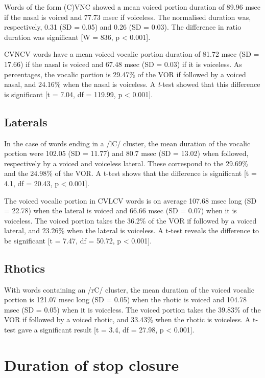 \documentclass[11pt,a4paper,openany]{memoir}\usepackage[]{graphicx}\usepackage[]{color}
\begin{document}
Words of the form (C)VNC showed a mean voiced portion duration of 89.96 msec if the nasal is voiced and 77.73 msec if voiceless.
The normalised duration was, respectively, 0.31 (SD = 0.05) and 0.26 (SD = 0.03).
The difference in ratio duration was significant [W = 836, p < 0.001].



CVNCV words have a mean voiced vocalic portion duration of 81.72 msec (SD = 17.66) if the nasal is voiced and 67.48 msec  (SD = 0.03) if it is voiceless.
As percentages, the vocalic portion is 29.47\% of the VOR if followed by a voiced nasal, and 24.16\% when the nasal is voiceless.
A \textit{t}-test showed that this difference is significant [t = 7.04, df = 119.99, p < 0.001].


\subsection{Laterals}


In the case of words ending in a /lC/ cluster, the mean duration of the vocalic portion were 102.05 (SD = 11.77) and 80.7 msec (SD = 13.02) when followed, respectively by a voiced and voiceless lateral.
These correspond to the 29.69\% and the 24.98\% of the VOR.
A t-test shows that the difference is significant [t = 4.1, df = 20.43, p < 0.001].




The voiced vocalic portion in CVLCV words is on average 107.68 msec long (SD = 22.78) when the lateral is voiced and 66.66 msec (SD = 0.07) when it is voiceless.
The voiced portion takes the 36.2\% of the VOR if followed by a voiced lateral, and 23.26\% when the lateral is voiceless.
A t-test reveals the difference to be significant [t = 7.47, df = 50.72, p < 0.001].

\subsection{Rhotics}



With words containing an /rC/ cluster, the mean duration of the voiced vocalic portion is 121.07 msec long (SD = 0.05) when the rhotic is voiced and 104.78 msec (SD = 0.05) when it is voiceless.
The voiced portion takes the 39.83\% of the VOR if followed by a voiced rhotic, and 33.43\% when the rhotic is voiceless.
A t-test gave a significant result [t = 3.4, df = 27.98, p < 0.001].

\section{Duration of stop closure}
\end{document}
